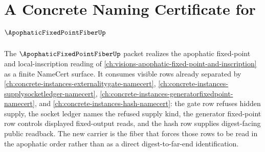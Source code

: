 \chapter{A Concrete Naming Certificate for $\ApophaticFixedPointFiberUp$}
\label{ch:concrete-instances-apophatic-fixed-point-fiber-namecert}

The $\ApophaticFixedPointFiberUp$ packet realizes the apophatic fixed-point and local-inscription reading of \autoref{ch:visions-apophatic-fixed-point-and-inscription} as a finite NameCert surface. It consumes visible rows already separated by \autoref{ch:concrete-instances-externalitygate-namecert}, \autoref{ch:concrete-instances-supplysocketledger-namecert}, \autoref{ch:concrete-instances-generatorfixedpoint-namecert}, and \autoref{ch:concrete-instances-hash-namecert}: the gate row refuses hidden supply, the socket ledger names the refused supply kind, the generator fixed-point row controls displayed fixed-output reads, and the hash row supplies digest-facing public readback. The new carrier is the fiber that forces those rows to be read in the apophatic order rather than as a direct digest-to-far-end identification.

